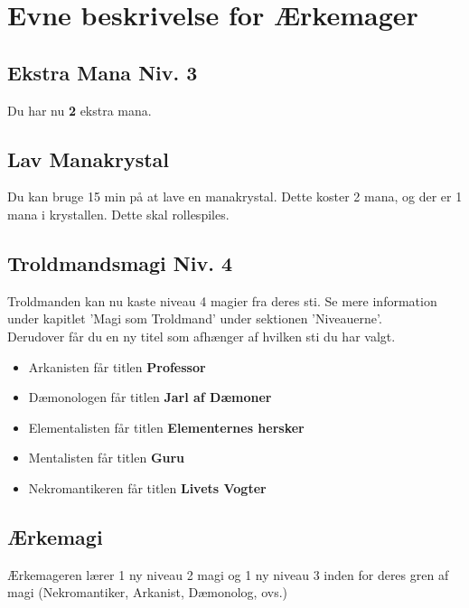\section*{Evne beskrivelse for Ærkemager}

\subsection*{Ekstra Mana Niv. 3}
Du har nu \textbf{2} ekstra mana.

\subsection*{Lav Manakrystal}
Du kan bruge 15 min på at lave en manakrystal. Dette koster 2 mana, og der er 1 mana i krystallen. Dette skal rollespiles. 


\subsection*{Troldmandsmagi Niv. 4}
Troldmanden kan nu kaste niveau 4 magier fra deres sti. Se mere information under kapitlet 'Magi som Troldmand' under sektionen 'Niveauerne'. \\
Derudover får du en ny titel som afhænger af hvilken sti du har valgt.\\
\begin{itemize}
    \item Arkanisten får titlen \textbf{Professor}
    \item Dæmonologen får titlen \textbf{Jarl af Dæmoner}
    \item Elementalisten får titlen \textbf{Elementernes hersker}
    \item Mentalisten får titlen \textbf{Guru}
    \item Nekromantikeren får titlen \textbf{Livets Vogter}
\end{itemize}

\subsection*{Ærkemagi}
Ærkemageren lærer 1 ny niveau 2 magi og 1 ny niveau 3 inden for deres gren af magi (Nekromantiker, Arkanist, Dæmonolog, ovs.)



